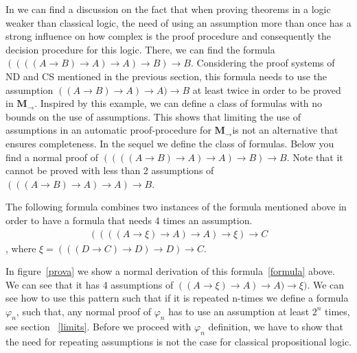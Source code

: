 \documentclass[11pt]{llncs}
\newcommand{\imply}{\ensuremath{\rightarrow}}
\newcommand{\mil}{\ensuremath{\mathbf{M}_{\rightarrow}}}
\begin{document}
In \cite{GillesJiang} we can find a  discussion on the fact that when proving theorems in a logic weaker than classical logic, the need of using an assumption more than once has a strong influence on how complex is the proof procedure and consequently the decision procedure for this logic. There, we can find the formula $((((A\imply B)\imply A)\imply A)\imply B)\imply B$. Considering the proof systems of ND and CS  mentioned in the previous section, this formula needs to use the assumption $((A\imply B)\imply A)\imply A)\imply B$ at least twice in order to be proved in \mil. Inspired by this example, we can define a class of formulas with no bounds on the use of assumptions. This shows that limiting the use of assumptions in an automatic proof-procedure for \mil is not an alternative that ensures completeness. In the sequel we define the class of formulas. Below you find a normal proof of 
$((((A\imply B)\imply A)\imply A)\imply B)\imply B$. Note that it cannot be proved with less than 2 assumptions of $(((A\imply B)\imply A)\imply A)\imply B$.




The following formula combines two instances of the formula mentioned above in order to have a formula that needs 4 times an assumption. 
\begin{eqnarray}
((((A\imply \xi)\imply A)\imply A)\imply \xi)\imply C\label{formula}
\end{eqnarray}
, where 
$\xi=(((D\imply C)\imply D)\imply D)\imply C$.

 
In figure~\ref{prova} we show a normal derivation of this formula~\ref{formula} above. We can see that it has 4 assumptions of 
$((A\imply \xi)\imply A)\imply A)\imply \xi)$. We can see how to use this pattern such that if it is repeated n-times we define a formula $\varphi_n$, such that, any normal proof of $\varphi_n$ has to use an assumption at least $2^n$ times, see section ~\ref{limits}. Before we proceed with $\varphi_n$ definition, we have to show that the need for repeating assumptions is not the case for classical propositional logic. 
\end{document}
